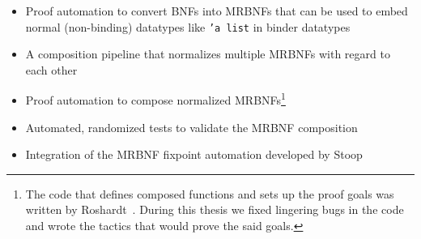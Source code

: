 \begin{itemize}
\item{Proof automation to convert \acp{BNF} into \acp{MRBNF} that can be used to embed normal (non-binding) datatypes like \texttt{'a list} in binder datatypes}
\item{A composition pipeline that normalizes multiple \acp{MRBNF} with regard to each other}
\item{Proof automation to compose normalized \acp{MRBNF}\footnote{The code that defines composed functions and sets up the proof goals was written by Roshardt~\cite{mrbnf_composition}. During this thesis we fixed lingering bugs in the code and wrote the tactics that would prove the said goals.}}
\item{Automated, randomized tests to validate the \ac{MRBNF} composition}
\item{Integration of the \ac{MRBNF} fixpoint automation developed by Stoop~\cite{mrbnf_fixpoint}}
\end{itemize}

